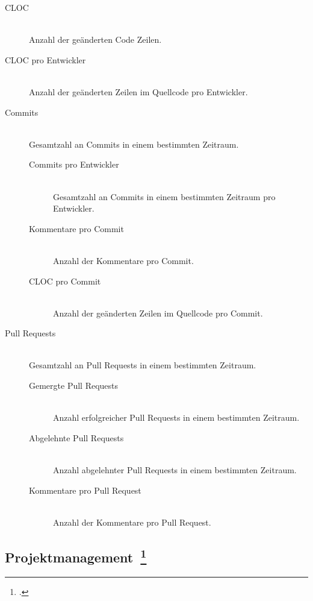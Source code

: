 \begin{description}
  \item[\ac{CLOC}] \hfill \\ Anzahl der geänderten Code Zeilen.
  \item[\ac{CLOC} pro Entwickler] \hfill \\ Anzahl der geänderten Zeilen im Quellcode pro Entwickler.
  \item[Commits] \hfill \\ Gesamtzahl an Commits in einem bestimmten Zeitraum.
  \begin{description}
    \item[Commits pro Entwickler] \hfill \\ Gesamtzahl an Commits in einem bestimmten Zeitraum pro Entwickler.
    \item[Kommentare pro Commit] \hfill \\ Anzahl der Kommentare pro Commit.
    \item[\ac{CLOC} pro Commit] \hfill \\ Anzahl der geänderten Zeilen im Quellcode pro Commit.
  \end{description}
  \item[Pull Requests] \hfill \\ Gesamtzahl an Pull Requests in einem bestimmten Zeitraum.
  \begin{description}
    \item[Gemergte Pull Requests] \hfill \\ Anzahl erfolgreicher Pull Requests in einem bestimmten Zeitraum.
    \item[Abgelehnte Pull Requests] \hfill \\ Anzahl abgelehnter Pull Requests in einem bestimmten Zeitraum.
    \item[Kommentare pro Pull Request] \hfill \\ Anzahl der Kommentare pro Pull Request.
  \end{description}
\end{description}

\clearpage
\subsection[Projektmanagement]{Projektmanagement~\footcite[vgl.][S.37ff]{davis_agile_2015}}


